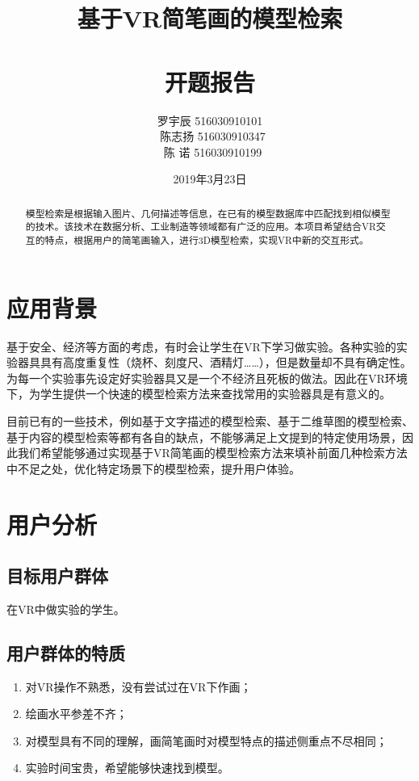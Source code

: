 \documentclass{article}
\title{基于VR简笔画的模型检索\\\ \\ 开题报告}
\author{
罗宇辰 516030910101  \\\
陈志扬 516030910347  \\\
陈  诺 516030910199 
}
\date{2019年3月23日}
\begin{document}
\maketitle
\tableofcontents

\clearpage

\begin{abstract}
模型检索是根据输入图片、几何描述等信息，在已有的模型数据库中匹配找到相似模型的技术。该技术在数据分析、工业制造等领域都有广泛的应用。本项目希望结合VR交互的特点，根据用户的简笔画输入，进行3D模型检索，实现VR中新的交互形式。
\end{abstract}

\section{应用背景}

基于安全、经济等方面的考虑，有时会让学生在VR下学习做实验。各种实验的实验器具具有高度重复性（烧杯、刻度尺、酒精灯……），但是数量却不具有确定性。为每一个实验事先设定好实验器具又是一个不经济且死板的做法。因此在VR环境下，为学生提供一个快速的模型检索方法来查找常用的实验器具是有意义的。

目前已有的一些技术，例如基于文字描述的模型检索、基于二维草图的模型检索、基于内容的模型检索等都有各自的缺点，不能够满足上文提到的特定使用场景，因此我们希望能够通过实现基于VR简笔画的模型检索方法来填补前面几种检索方法中不足之处，优化特定场景下的模型检索，提升用户体验。  


\section{用户分析}

\subsection{目标用户群体}
    在VR中做实验的学生。
\subsection{用户群体的特质}
\begin{enumerate}
    \item 对VR操作不熟悉，没有尝试过在VR下作画；
    \item 绘画水平参差不齐；
    \item 对模型具有不同的理解，画简笔画时对模型特点的描述侧重点不尽相同；
    \item 实验时间宝贵，希望能够快速找到模型。
\end{enumerate}
\end{document}
